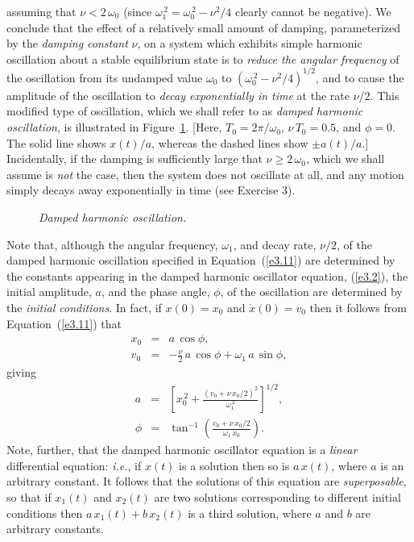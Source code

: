   assuming  that $\nu< 2\,\omega_0$ (since
 $\omega_1^{\,2}=\omega_0^{\,2}-\nu^2/4$ clearly cannot be negative). We conclude that the effect of a relatively small amount of damping, parameterized
 by the {\em damping constant}\/ $\nu$, 
 on  a system which exhibits simple harmonic oscillation about a stable equilibrium state is to {\em reduce the
 angular frequency}\/ of the oscillation from its undamped value $\omega_0$ to $(\omega_0^{\,2}-\nu^2/4)^{1/2}$,  and to cause the amplitude of the oscillation to {\em decay exponentially
 in time}\/ at the rate $\nu/2$. This modified type of oscillation, which we shall refer to  as {\em damped harmonic oscillation},  is illustrated in Figure~\ref{f3.1}. [Here, $T_0=2\pi/\omega_0$,
 $\nu\,T_0=0.5$, and $\phi=0$. The solid line shows $x(t)/a$, whereas the dashed lines
 show $\pm a(t)/a$.]
Incidentally, if the damping is sufficiently large that $\nu\geq 2\,\omega_0$, which we shall assume is {\em not}\/ the case, then
 the system does not oscillate at all, and any motion simply decays away exponentially
 in time (see Exercise 3). 
 
\begin{figure}
\epsfysize=3in
\centerline{}
\caption{\em Damped harmonic oscillation.}\label{f3.1}   
\end{figure}

 Note that, although the angular frequency, $\omega_1$, and decay rate, $\nu/2$,
 of the damped harmonic oscillation specified in Equation~(\ref{e3.11}) are determined by the constants appearing in the damped harmonic oscillator equation, (\ref{e3.2}), the initial amplitude, $a$, and the phase angle, $\phi$, 
 of the oscillation
 are determined by the {\em initial conditions}. In fact, if $x(0)=x_0$ and $\dot{x}(0)=v_0$
 then it follows from Equation~(\ref{e3.11}) that
 \begin{eqnarray}
 x_0 &=&a\,\cos\phi,\\[0.5ex]
 v_0 &=& - \frac{\nu}{2}\,a\,\cos\phi + \omega_1\,a\,\sin\phi,
 \end{eqnarray}
giving
 \begin{eqnarray}
 a &=&\left[x_0^{\,2} + \frac{(v_0+\nu\,x_0/2)^2}{\omega_1^{\,2}}\right]^{1/2},\\[0.5ex]
 \phi &=& \tan^{-1}\left(\frac{v_0+\nu\,x_0/2}{\omega_1\,x_0}\right).
 \end{eqnarray}
 Note, further, that the damped harmonic oscillator equation is  a {\em linear}\/ differential equation: {\em i.e.}, if $x(t)$ is a
 solution then so is $a\,x(t)$, where $a$ is an arbitrary constant. It follows
 that the solutions of this equation are {\em superposable},
 so that if $x_1(t)$ and $x_2(t)$ are two solutions corresponding to different initial
 conditions then $a\,x_1(t)+b\,x_2(t)$ is a third solution, where $a$ and $b$
 are arbitrary constants. 
 
